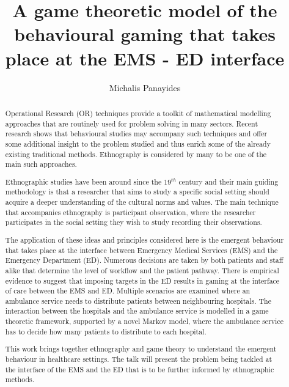 \documentclass{article}
\title{A game theoretic model of the behavioural gaming that takes place at the EMS
 - ED interface}
\author{Michalis Panayides}
\begin{document}
\maketitle
\begin{abstract}
    Operational Research (OR) techniques provide a toolkit of mathematical 
    modelling approaches that are routinely used for problem solving in many
    sectors. Recent research shows that behavioural studies may accompany such
    techniques and offer some additional insight to the problem studied and 
    thus enrich some of the already existing traditional methods. Ethnography is 
    considered by many to be one of the main such approaches.

    Ethnographic studies have been around since the \(19^{th}\) century and
    their main guiding methodology is that a researcher that aims to study 
    a specific social setting should acquire a deeper understanding of the 
    cultural norms and values. The main technique that accompanies ethnography 
    is participant observation, where the researcher participates in the social 
    setting they wish to study recording their observations.

    The application of these ideas and principles considered here is the emergent 
    behaviour that takes place at the interface between Emergency Medical Services 
    (EMS) and the Emergency Department (ED). Numerous decisions are taken by both 
    patients and staff alike that determine the level of workflow and the patient 
    pathway. There is empirical evidence to suggest that imposing targets in the ED 
    results in gaming at the interface of care between the EMS and ED. Multiple 
    scenarios are examined where an ambulance service needs to distribute patients 
    between neighbouring hospitals. The interaction between the hospitals and the 
    ambulance service is modelled in a game theoretic framework, supported by a
    novel Markov model, where the ambulance service has to decide how many patients 
    to distribute to each hospital.

    This work brings together ethnography and game theory to understand the emergent
    behaviour in healthcare settings. The talk will present the problem being tackled
    at the interface of the EMS and the ED that is to be further informed by ethnographic methods.
        
\end{abstract}
    
\end{document}
